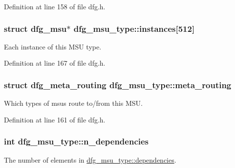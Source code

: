 Definition at line 158 of file dfg.\-h.

\hypertarget{structdfg__msu__type_aac780324344ec376a3dc3d18704ca7c6}{
\subsubsection[{instances}]{\setlength{\rightskip}{0pt plus 5cm}struct {\bf dfg\-\_\-msu}$\ast$ dfg\-\_\-msu\-\_\-type\-::instances\mbox{[}512\mbox{]}}}\label{structdfg__msu__type_aac780324344ec376a3dc3d18704ca7c6}


Each instance of this M\-S\-U type. 



Definition at line 167 of file dfg.\-h.

\hypertarget{structdfg__msu__type_ac9778638f0dc0bd6e0139f2181ea5f13}{
\subsubsection[{meta\-\_\-routing}]{\setlength{\rightskip}{0pt plus 5cm}struct {\bf dfg\-\_\-meta\-\_\-routing} dfg\-\_\-msu\-\_\-type\-::meta\-\_\-routing}}\label{structdfg__msu__type_ac9778638f0dc0bd6e0139f2181ea5f13}


Which types of msus route to/from this M\-S\-U. 



Definition at line 161 of file dfg.\-h.

\hypertarget{structdfg__msu__type_a7415469cbf6b8a856375aa211c4732c2}{
\subsubsection[{n\-\_\-dependencies}]{\setlength{\rightskip}{0pt plus 5cm}int dfg\-\_\-msu\-\_\-type\-::n\-\_\-dependencies}}\label{structdfg__msu__type_a7415469cbf6b8a856375aa211c4732c2}


The number of elements in \hyperlink{structdfg__msu__type_ae99af1194aeded6b89928e96dfb054d4}{dfg\-\_\-msu\-\_\-type\-::dependencies}. 



